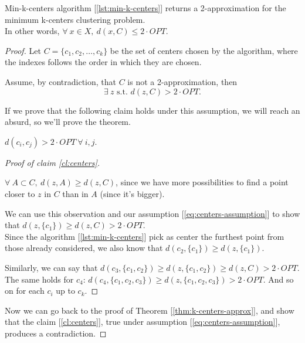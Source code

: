 \begin{thm}\label{thm:k-centers-approx}
    Min-k-centers algorithm [\ref{lst:min-k-centers}] returns a 2-approximation for the minimum k-centers clustering problem.\\
    In other words, $\forall\ x \in X,\ d(x,C) \leq 2 \cdot OPT$.
\end{thm}
\begin{proof}
    Let $C = \{c_1, c_2, \ldots, c_k\}$ be the set of centers chosen by the algorithm, where the indexes follows the order in which they are chosen.
    
    Assume, by contradiction, that $C$ is not a 2-approximation, then 
    \begin{equation}\label{eq:centers-assumption}
        \exists\ z \text{ s.t. } d(z, C) > 2 \cdot OPT.
    \end{equation}
    
    If we prove that the following claim holds under this assumption, we will reach an absurd, so we'll prove the theorem.
    \begin{claim}\label{cl:centers}
        $d(c_i, c_j) > 2 \cdot OPT\ \forall\ i,j$.
    \end{claim}
    \begin{proof}[Proof of claim \ref{cl:centers}]
        \begin{obs}
            $\forall\ A \subset C,\ d(z,A) \geq d(z,C)$, since we have more possibilities to find a point closer to $z$ in $C$ than in $A$ (since it's bigger).
        \end{obs}
        We can use this observation and our assumption [\ref{eq:centers-assumption}] to show that $d(z, \{c_1\}) \geq d(z,C) > 2 \cdot OPT$.\\
        Since the algorithm [\ref{lst:min-k-centers}] pick as center the furthest point from those already considered, we also know that $d(c_2, \{c_1\}) \geq d(z, \{c_1\})$.
        
        Similarly, we can say that $d(c_3, \{c_1, c_2\}) \geq d(z, \{c_1, c_2\}) \geq d(z,C) > 2 \cdot OPT$.
        The same holds for $c_4$: $d(c_4, \{c_1, c_2, c_3\}) \geq d(z, \{c_1, c_2, c_3\}) > 2 \cdot OPT$.
        And so on for each $c_i$ up to $c_k$.
    \end{proof}

    Now we can go back to the proof of Theorem [\ref{thm:k-centers-approx}], and show that the claim [\ref{cl:centers}], true under assumption [\ref{eq:centers-assumption}], produces a contradiction.
    

\end{proof}
